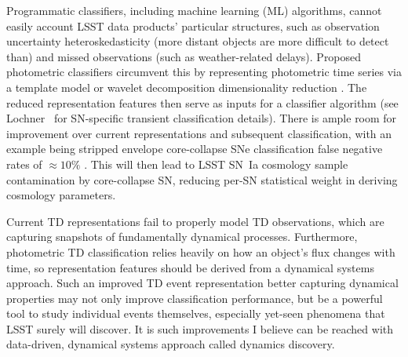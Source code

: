 \documentclass[modern]{aastex631}
\begin{document}
Programmatic classifiers, including machine learning (ML) algorithms, cannot easily account LSST data products' particular structures, such as observation uncertainty heteroskedasticity (more distant objects are more difficult to detect than) and missed observations (such as weather-related delays).
Proposed photometric classifiers circumvent this by representing photometric time series via a template model or wavelet decomposition dimensionality reduction \citep{Malz2019}. 
The reduced representation features then serve as inputs for a classifier algorithm (see Lochner~\citeyear{Lochner2016} for SN-specific transient classification details). 
There is ample room for improvement over current representations and subsequent classification, with an example being stripped envelope core-collapse SNe classification false negative rates of $\approx10\%$ \citep{Malz2019}. 
This will then lead to LSST SN~Ia cosmology sample contamination by core-collapse SN, reducing per-SN statistical weight in deriving cosmology parameters. 

Current TD representations fail to properly model TD observations, which are capturing snapshots of fundamentally dynamical processes. 
Furthermore, photometric TD classification relies heavily on how an object's flux changes with time, so representation features should be derived from a dynamical systems approach. 
Such an improved TD event representation better capturing dynamical properties may not only improve classification performance, but be a powerful tool to study individual events themselves, especially yet-seen phenomena that LSST surely will discover. 
It is such improvements I believe can be reached with data-driven, dynamical systems approach called dynamics discovery. 
\end{document}
